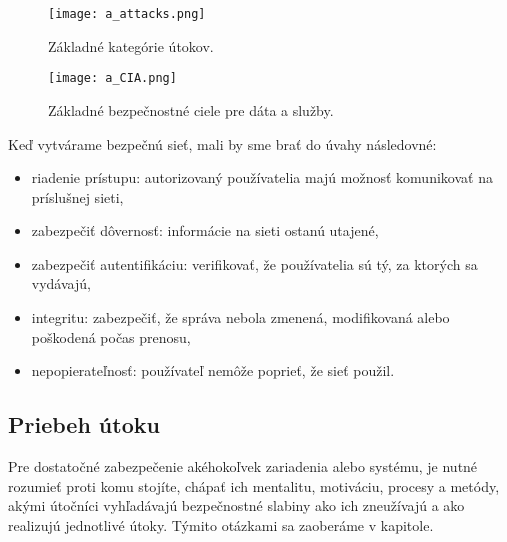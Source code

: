 \documentclass[12pt,a4paper,oneside,openright]{report}
\begin{document}
\begin{figure*}[h]
	\centering
	\texttt{[image: a\_attacks.png]}
	\caption{Základné kategórie útokov. \cite{StallingsCryptographyandnetworksecurity}}
	\label{f:o_attacks}
\end{figure*}

\begin{figure*}[h]
	\centering
	\texttt{[image: a\_CIA.png]}
	\caption{Základné bezpečnostné ciele pre dáta a služby.\cite{StallingsCryptographyandnetworksecurity}}
	\label{f:o_cia}
\end{figure*}

Keď vytvárame bezpečnú sieť, mali by sme brať do úvahy následovné\cite{bidgoli2006handbook}:
\singlespacing
\begin{itemize}
\item riadenie prístupu: autorizovaný používatelia majú možnosť komunikovať na príslušnej sieti, 
\item zabezpečiť dôvernosť: informácie na sieti ostanú utajené, 
\item zabezpečiť autentifikáciu: verifikovať, že používatelia sú tý, za ktorých sa vydávajú,
\item integritu: zabezpečiť, že správa nebola zmenená, modifikovaná alebo poškodená počas prenosu,
\item nepopierateľnosť: používateľ nemôže poprieť, že sieť použil.
\end{itemize}
\onehalfspacing

%


\subsection{Priebeh útoku} \label{s_attack}
Pre dostatočné zabezpečenie akéhokoľvek zariadenia alebo systému, je nutné rozumieť proti komu stojíte, chápať ich mentalitu, motiváciu, procesy a metódy, akými útočníci vyhľadávajú bezpečnostné slabiny ako ich zneužívajú a ako realizujú jednotlivé útoky. Týmito otázkami sa zaoberáme v kapitole.
\end{document}
